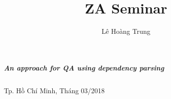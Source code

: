 \documentclass{beamer}
\title[]{ZA Seminar}
\author[]{Lê Hoàng Trung} %
\institute[HCMUS] %
{
	\textit{le.hg.trung@gmail.com} %
}
\date[\today]{} %
\begin{document}
\begin{frame}[plain]
	\maketitle
	\small
	{\centering\itshape \huge{\bf{An approach for QA using dependency parsing}} \par}
	\footnotesize
	\begin{table}[c]
		\centering 
		\begin{tabular}{rrl}
							
		\end{tabular}
	\end{table}
	\begin{center}
		{\footnotesize Tp. Hồ Chí Minh, Tháng 03/2018}
	\end{center}
\end{frame}
	
	
\end{document}
